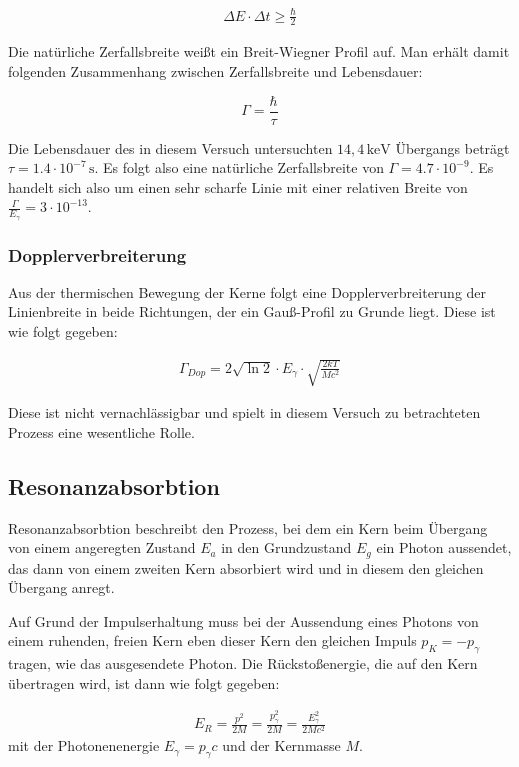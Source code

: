 {\begin{align}
\Delta E\cdot\Delta t\geq\frac{\hbar}{2}
\end{align}


Die natürliche Zerfallsbreite weißt ein Breit-Wiegner Profil auf. Man erhält damit folgenden Zusammenhang zwischen Zerfallsbreite und Lebensdauer:

\[\Gamma=\frac{\hbar}{\tau}\]


Die Lebensdauer des in diesem Versuch untersuchten $14,4\,\mathrm{keV}$ Übergangs beträgt  $\tau = 1.4\cdot 10^{-7}\,\mathrm{s}$. Es folgt also eine natürliche Zerfallsbreite von $\Gamma = 4.7\cdot 10^{-9}$. Es handelt sich also um einen sehr scharfe Linie mit einer relativen Breite von $\frac{\Gamma}{E_{\gamma}}=3\cdot 10^{-13}$.\cite{jakobs}


\subsubsection{Dopplerverbreiterung}

Aus der thermischen Bewegung der Kerne folgt eine Dopplerverbreiterung der Linienbreite in beide Richtungen, der ein Gauß-Profil zu Grunde liegt. Diese ist wie folgt gegeben:

\begin{align}
\Gamma_{Dop} = 2\sqrt{\ln2}\cdot E_{\gamma}\cdot\sqrt{\frac{2kT}{Mc^2}}
\end{align}

Diese ist nicht vernachlässigbar und spielt in diesem Versuch zu betrachteten Prozess eine wesentliche Rolle. \cite{jakobs}

\subsection{Resonanzabsorbtion}

Resonanzabsorbtion beschreibt den Prozess, bei dem ein Kern beim Übergang von einem angeregten Zustand  $E_a$ in den Grundzustand $E_g$ ein Photon aussendet, das dann von einem zweiten Kern absorbiert wird und in diesem den gleichen Übergang anregt. 

Auf Grund der Impulserhaltung muss bei der Aussendung eines Photons von einem ruhenden, freien Kern eben dieser Kern den gleichen Impuls  $p_K = -p_{\gamma}$ tragen, wie das ausgesendete Photon. Die Rückstoßenergie, die auf den Kern übertragen wird, ist dann wie folgt gegeben:

\begin{align}
E_R = \frac{p^2}{2M} = \frac{p_{\gamma}^2}{2M} = \frac{E_{\gamma}^2}{2Mc^2} \label{5}
\end{align}
 mit der Photonenenergie $E_{\gamma}=p_{\gamma}c$ und der Kernmasse $M$.

}
